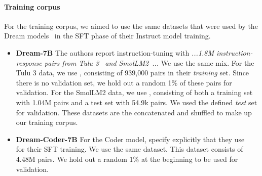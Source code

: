 \documentclass{article}
\begin{document}
\paragraph{Training corpus}
\label{training_set}
For the training corpus, we aimed to use the same datasets that were used by the Dream models~\citep{ye_dream_2025, xie_dream-coder_2025} in the SFT phase of their Instruct model training. 
%
\begin{itemize}
    \item \textbf{Dream-7B} The authors report instruction-tuning with \emph{...1.8M instruction-response pairs from Tulu 3~\citep{tulu3_2025} and SmolLM2~\citep{smol_2025}...} 
    We use the same mix. 
    For the Tulu 3 data, we use , consisting of 939,000 pairs in their \emph{training} set. Since there is no validation set, we hold out a random 1\% of these pairs for validation.
    For the SmolLM2 data, we use , consisting of both a training set with 1.04M pairs and a test set with 54.9k pairs. We used the defined \emph{test} set for validation. 
    These datasets are the concatenated and shuffled to make up our training corpus.

    \item \textbf{Dream-Coder-7B} For the Coder model, \citet{xie_dream-coder_2025} specify explicitly that they use ~\citep{codefuse2025samplemattersleveragingmixtureofexperts} for their SFT training. We use the same dataset. This dataset consists of 4.48M pairs. We hold out a random 1\% at the beginning to be used for validation. 
\end{itemize}
\end{document}
